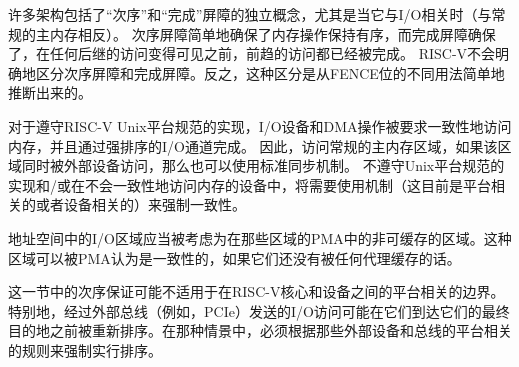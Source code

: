许多架构包括了“次序”和“完成”屏障的独立概念，尤其是当它与I/O相关时（与常规的主内存相反）。
次序屏障简单地确保了内存操作保持有序，而完成屏障确保了，在任何后继的访问变得可见之前，前趋的访问都已经被完成。
RISC-V不会明确地区分次序屏障和完成屏障。反之，这种区分是从FENCE位的不同用法简单地推断出来的。

对于遵守RISC-V Unix平台规范的实现，I/O设备和DMA操作被要求一致性地访问内存，并且通过强排序的I/O通道完成。
因此，访问常规的主内存区域，如果该区域同时被外部设备访问，那么也可以使用标准同步机制。
不遵守Unix平台规范的实现和/或在不会一致性地访问内存的设备中，将需要使用机制（这目前是平台相关的或者设备相关的）来强制一致性。

地址空间中的I/O区域应当被考虑为在那些区域的PMA中的非可缓存的区域。这种区域可以被PMA认为是一致性的，如果它们还没有被任何代理缓存的话。

这一节中的次序保证可能不适用于在RISC-V核心和设备之间的平台相关的边界。特别地，经过外部总线（例如，PCIe）发送的I/O访问可能在它们到达它们的最终目的地之前被重新排序。在那种情景中，必须根据那些外部设备和总线的平台相关的规则来强制实行排序。


